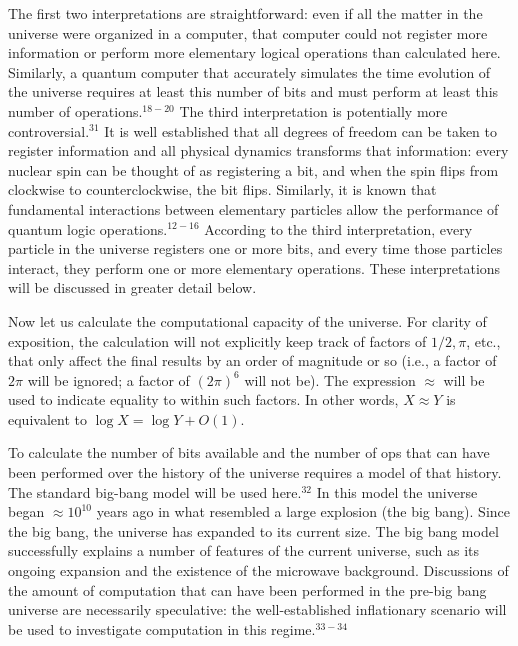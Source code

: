 \bigskip\noindent  
The first two interpretations are  straightforward: 
even if all the matter in the universe were organized in
a computer, that computer could not register more information or
perform more elementary logical operations than calculated here.
Similarly, a quantum computer that accurately simulates the time evolution
of the universe requires at least this number of bits and must
perform at least this number of operations.$^{18-20}$ The third interpretation 
is potentially more controversial.$^{31}$  It is well established that
all degrees of freedom can be taken to register information and all 
physical dynamics transforms that information:
every nuclear spin can be thought of as registering a bit, and when 
the spin flips from clockwise to counterclockwise, the bit flips.  
Similarly, it is known that fundamental interactions between
elementary particles allow the performance of quantum logic
operations.$^{12-16}$
According to the third interpretation, every particle in the universe 
registers one or more bits, and every time those particles interact,
they perform one or more elementary operations.    
These interpretations will be discussed in greater detail below. 

Now let us calculate the computational capacity of the universe.  For
clarity of exposition, the calculation will not explicitly keep track of
factors of $1/2, \pi$, etc., that only affect the final results by an
order of magnitude or so (i.e., a factor of $2\pi$ will be ignored;
a factor of $(2\pi)^6$ will not be).  The expression $\approx$ will be used 
to indicate equality to within such factors.  In other words, 
$X\approx Y$ is equivalent to $\log X = \log Y + O(1)$.

To calculate the number of bits available and the number of ops that can
have been performed over the history of the universe requires a model
of that history.  The standard big-bang model will be used here.$^{32}$ In
this model the universe began $\approx 10^{10}$ years ago in
what resembled a large explosion (the big bang).  Since the big bang,
the universe has expanded to its current size.  The big bang model
successfully explains a number of features of the current universe,
such as its ongoing expansion and the existence of the microwave background.
Discussions of the amount of computation that can have been performed in the 
pre-big bang universe are necessarily speculative: the well-established 
inflationary scenario will be used to investigate computation in
this regime.$^{33-34}$  

